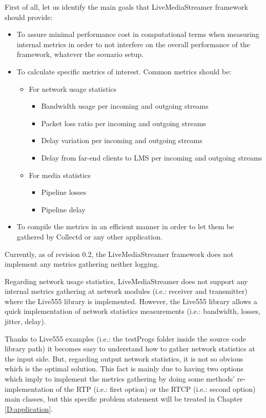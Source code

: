 First of all, let us identify the main goals that LiveMediaStreamer framework should provide:

\begin{itemize}
	\item To assure minimal performance cost in computational terms when measuring internal metrics in order to not interfere on the overall performance of the framework, whatever the scenario setup.
	\item To calculate specific metrics of interest. Common metrics should be:
	\begin{itemize}
		\item For network usage statistics
		\begin{itemize}
			\item Bandwidth usage per incoming and outgoing streams
			\item Packet loss ratio per incoming and outgoing streams
			\item Delay variation per incoming and outgoing streams
			\item Delay from far-end clients to LMS per incoming and outgoing streams
		\end{itemize}
		\item For media statistics
		\begin{itemize}
			\item Pipeline losses 
			\item Pipeline delay  
		\end{itemize}
	\end{itemize}
	\item To compile the metrics in an efficient manner in order to let them be gathered by Collectd or any other application.
\end{itemize}

Currently, as of revision 0.2, the LiveMediaStreamer framework does not implement any metrics gathering neither logging.

Regarding network usage statistics, LiveMediaStreamer does not support any internal metrics gathering at network modules (i.e.: receiver and transmitter) where the Live555 library is implemented. However, the Live555 library allows a quick implementation of network statistics measurements (i.e.: bandwidth, losses, jitter, delay). 

Thanks to Live555 examples (i.e.: the testProgs folder inside the source code library path) it becomes easy to understand how to gather network statistics at the input side. But, regarding output network statistics, it is not so obvious which is the optimal solution. This fact is mainly due to having two options which imply to implement the metrics gathering by doing some methods' re-implementation of the RTP (i.e.: first option) or the RTCP (i.e.: second option) main classes, but this specific problem statement will be treated in Chapter \ref{D:application}.

